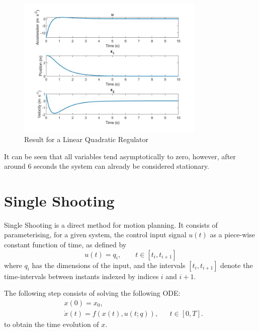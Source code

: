 \begin{figure}[h!]
\centering
\includegraphics[width=0.8\textwidth]{Images/solution_lqr.jpg}
\caption{Result for a Linear Quadratic Regulator}
\label{fig:solution_lqr}
\end{figure}

\par It can be seen that all variables tend asymptotically to zero, however, after around 6 seconds the system can already be considered stationary.



\section{Single Shooting}

\par Single Shooting is a direct method for motion planning. It consists of parameterising, for a given system, the control input signal $u(t)$ as a piece-wise constant function of time, as defined by 
\begin{equation}
    \label{eq:single_shooting}
    u(t) = q_i, \qquad t\in [t_i,t_{i+1}]
\end{equation}
where $q_i$ has the dimensions of the input, and the intervals $[t_i,t_{i+1}]$ denote the time-intervals between instants indexed by indices $i$ and $i+1$.

\par The following step consists of solving the following ODE:
\begin{equation}
    \label{eq:ode_zoh}
    \begin{aligned}
        & x(0) = x_0, \\
        & \dot{x}(t) = f(x(t),u(t;q)), && t\in[0,T].
    \end{aligned}
\end{equation}
to obtain the time evolution of $x$.


